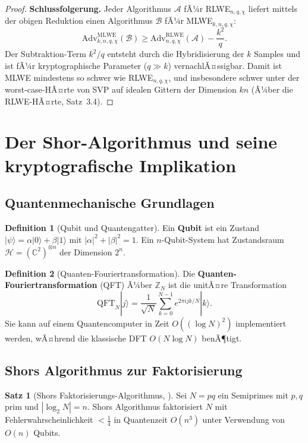 ﻿\documentclass[a4paper,12pt]{article}
\theoremstyle{definition}
\newtheorem{definition}{Definition}[section]
\newtheorem{satz}{Satz}[section]
\begin{document}
\begin{proof}
\textbf{Schlussfolgerung.}
Jeder Algorithmus $\mathcal{A}$ fÃ¼r RLWE$_{n,q,\chi}$ liefert mittels der
obigen Reduktion einen Algorithmus $\mathcal{B}$ fÃ¼r MLWE$_{k,n,q,\chi}$:
\[
  \mathrm{Adv}^\mathrm{MLWE}_{k,n,q,\chi}(\mathcal{B})
  \geq \mathrm{Adv}^\mathrm{RLWE}_{n,q,\chi}(\mathcal{A}) - \frac{k^2}{q}.
\]
Der Subtraktion-Term $k^2/q$ entsteht durch die Hybridisierung der $k$ Samples
und ist fÃ¼r kryptographische Parameter ($q \gg k$) vernachlÃ¤ssigbar.
Damit ist MLWE mindestens so schwer wie RLWE$_{n,q,\chi}$, und
insbesondere schwer unter der worst-case-HÃ¤rte von SVP auf idealen Gittern
der Dimension $kn$ (Ã¼ber die RLWE-HÃ¤rte, Satz~3.4).
\end{proof}

\section{Der Shor-Algorithmus und seine kryptografische Implikation}

\subsection{Quantenmechanische Grundlagen}

\begin{definition}[Qubit und Quantengatter]
Ein \textbf{Qubit} ist ein Zustand $|\psi\rangle = \alpha|0\rangle + \beta|1\rangle$
mit $|\alpha|^2 + |\beta|^2 = 1$. Ein $n$-Qubit-System hat Zustandsraum
$\mathcal{H} = (\mathbb{C}^2)^{\otimes n}$ der Dimension $2^n$.
\end{definition}

\begin{definition}[Quanten-Fouriertransformation]
Die \textbf{Quanten-Fouriertransformation} (QFT) Ã¼ber $\mathbb{Z}_N$ ist die
unitÃ¤re Transformation
\[
  \mathrm{QFT}_N |j\rangle = \frac{1}{\sqrt{N}} \sum_{k=0}^{N-1} e^{2\pi i jk/N} |k\rangle.
\]
Sie kann auf einem Quantencomputer in Zeit $O((\log N)^2)$ implementiert werden,
wÃ¤hrend die klassische DFT $O(N \log N)$ benÃ¶tigt.
\end{definition}

\subsection{Shors Algorithmus zur Faktorisierung}

\begin{satz}[Shors Faktorisierungs-Algorithmus, \cite{Sho94}]
\label{satz:shor}
Sei $N = pq$ ein Semiprimes mit $p, q$ prim und $|\log_2 N| = n$.
Shors Algorithmus faktorisiert $N$ mit Fehlerwahrscheinlichkeit $< \frac{1}{4}$
in Quantenzeit $O(n^3)$ unter Verwendung von $O(n)$ Qubits.
\end{satz}
\end{document}
